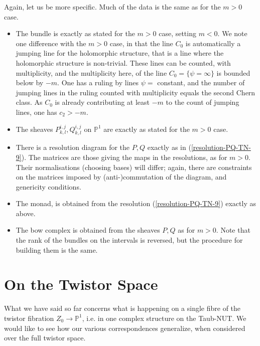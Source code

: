 \documentclass[12pt]{article}
\theoremstyle{definition}
\theoremstyle{remark}
\numberwithin{theorem}{section}
\def\bP{{\mathbb {P}}}
\begin{document}
  Again, let us be more specific. Much of the data  is the same as for the $m>0$ case. 
\begin{itemize}
\item The bundle is exactly as stated for the $m>0$ case, setting $m<0$. We note one difference with the $m>0$ case, in that 
the line $C_0$ is automatically a jumping line for the holomorphic structure, that is a line where the holomorphic structure is non-trivial. These lines can be counted, with multiplicity, and the multiplicity here, of the line $C_0=\{ \psi = \infty\}$ is bounded below by $-m$. One has a ruling by lines $\psi = $ constant, 
  and  the number of jumping lines in the  ruling counted with multiplicity equals the second Chern class. As $C_0$ is already  contributing at least $-m$ to the count of jumping lines, one has  $c_2> -m$.
\item The   sheaves $P^{i,j}_{k,l}, Q^{i,j}_{k,l}$ on $\bP^1$ are exactly as stated for the $m>0$ case.
\item There is a resolution diagram for the $P,Q$ exactly as in (\ref{resolution-PQ-TN-9}).  The  matrices are those giving the maps in the resolutions,  as for $m>0$.  Their normalisations (choosing bases) will differ; again, there are constraints on the matrices imposed by (anti-)commutation of the diagram, and genericity conditions.
\item The monad, is obtained from the resolution (\ref{resolution-PQ-TN-9}) exactly as above.
\item The bow complex is obtained from the  sheaves $P,Q$ as for $m>0$. Note that the rank of the bundles on the intervals is reversed, but the procedure for building them is the same.  
\end{itemize}

  \section{On the Twistor Space}
What we have said so far concerns what is happening on a single fibre of the twistor fibration $Z_0\rightarrow \bP^1$, i.e. in one complex structure on the Taub-NUT.  We would like to see how our various correspondences generalize, when considered over the full twistor space.
  
\end{document}
